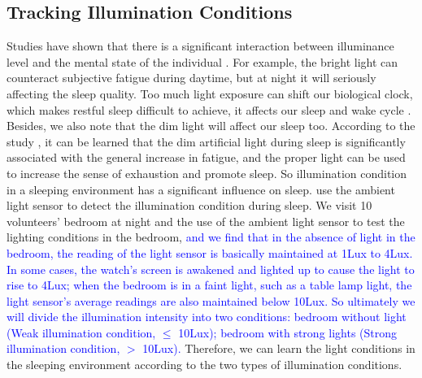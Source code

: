 \subsection{Tracking Illumination Conditions \label{sec:illumination}}
Studies have shown that there is a significant interaction between illuminance level and the mental state of the individual \cite{light77}.
For example, the bright light can counteract subjective fatigue during daytime, but at night it will seriously affecting the sleep quality.
Too much light exposure can shift our biological clock, which makes restful sleep difficult to achieve, it affects our sleep and wake cycle
\cite{light2007}.  Besides, we also note that the dim light will affect our sleep too. According to the study \cite{light2016}, it can be
learned that the dim artificial light during sleep is significantly associated with the general increase in fatigue, and the proper light
can be used to increase the sense of exhaustion and promote sleep. So illumination condition in a sleeping environment has a significant
influence on sleep. {\systemname} use the ambient light sensor to detect the illumination condition during sleep. We visit 10 volunteers'
bedroom at night and the use of the ambient light sensor to test the lighting conditions in the bedroom, \textcolor{blue}{and we find that
in the absence of light in the bedroom, the reading of the light sensor is basically maintained at 1Lux to 4Lux. In some cases, the watch's
screen is awakened and lighted up to cause the light to rise to 4Lux; when the bedroom is in a faint light, such as a table lamp light, the
light sensor's average readings are also maintained below 10Lux. So ultimately we will divide the illumination intensity into two
conditions: bedroom without light (Weak illumination condition, $\leq$ 10Lux);  bedroom with strong lights (Strong illumination condition,
$>$ 10Lux).} Therefore, we can learn the light conditions in the sleeping environment according to the two types of illumination
conditions.

